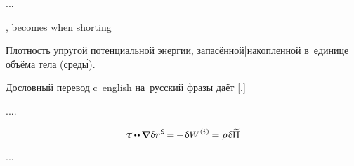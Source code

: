 ...




{\small
\setlength{\parindent}{0pt}

\begin{leftverticalbar}%

,
becomes when shorting

\begin{otherlanguage}{russian}
Плотность
упругой потенциальной энергии,
запасённой|накопленной
в~единице объёма тела (сред\'{ы}).
\end{otherlanguage}

\begin{otherlanguage}{russian}
Дословный перевод
c~english на~русский
фразы
даёт
[.]
\end{otherlanguage}

\end{leftverticalbar}
\par}


....


\begin{equation}
\cauchystress \dotdotp \hspace{-0.12ex} \boldnabla \hspace{.1ex} \variation{\currentlocationvector}^{\mathsf{S}} \hspace{-0.25ex}
= \hspace{-0.2ex} - \hspace{.2ex} \variation{\internalwork}
= \massdensity \hspace{.2ex} \variation{\widetilde{\potentialenergydensity}}
\end{equation}

...

